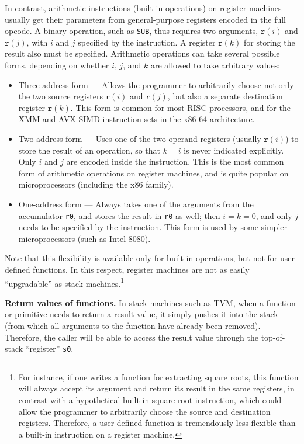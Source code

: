 \documentclass[12pt,oneside]{article}
\def\makepoint#1{\medbreak\noindent{\bf #1.\ }}
\def\nxsubpoint{\refstepcounter{subsubsection}%
  \smallbreak\makepoint{\thesubsubsection}}
\def\emb#1{\textbf{#1.}}
\begin{document}
In contrast, arithmetic instructions (built-in operations) on register machines usually get their parameters from general-purpose registers encoded in the full opcode. A binary operation, such as \texttt{SUB}, thus requires two arguments, $\texttt{r}(i)$ and $\texttt{r}(j)$, with $i$ and $j$ specified by the instruction. A register $\texttt{r}(k)$ for storing the result also must be specified. Arithmetic operations can take several possible forms, depending on whether $i$, $j$, and $k$ are allowed to take arbitrary values:
\begin{itemize}
\item {Three-address form} --- Allows the programmer to arbitrarily choose not only the two source registers $\texttt{r}(i)$ and $\texttt{r}(j)$, but also a separate destination register $\texttt{r}(k)$. This form is common for most RISC processors, and for the XMM and AVX SIMD instruction sets in the x86-64 architecture.
\item {Two-address form} --- Uses one of the two operand registers (usually $\texttt{r}(i)$) to store the result of an operation, so that $k=i$ is never indicated explicitly. Only $i$ and $j$ are encoded inside the instruction. This is the most common form of arithmetic operations on register machines, and is quite popular on microprocessors (including the x86 family).
\item {One-address form} --- Always takes one of the arguments from the accumulator \texttt{r0}, and stores the result in \texttt{r0} as well; then $i=k=0$, and only $j$ needs to be specified by the instruction. This form is used by some simpler microprocessors (such as Intel 8080).
\end{itemize}

Note that this flexibility is available only for built-in operations, but not for user-defined functions. In this respect, register machines are not as easily ``upgradable'' as stack machines.\footnote{For instance, if one writes a function for extracting square roots, this function will always accept its argument and return its result in the same registers, in contrast with a hypothetical built-in square root instruction, which could allow the programmer to arbitrarily choose the source and destination registers. Therefore, a user-defined function is tremendously less flexible than a built-in instruction on a register machine.}

\nxsubpoint\emb{Return values of functions}
In stack machines such as TVM, when a function or primitive needs to return a result value, it simply pushes it into the stack (from which all arguments to the function have already been removed). Therefore, the caller will be able to access the result value through the top-of-stack ``register'' \texttt{s0}.
\end{document}
